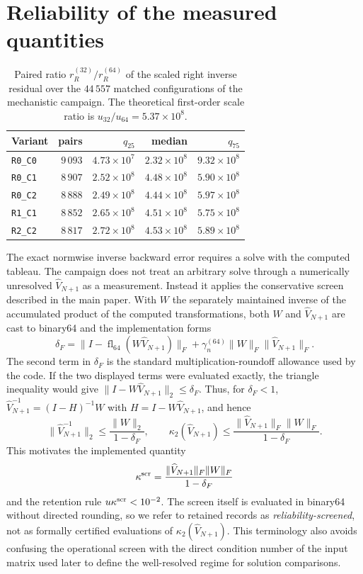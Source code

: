 \documentclass[supplement,review,onefignum,onetabnum]{siamart251216}
\newcommand{\fl}{\operatorname{fl}}
\begin{document}
\section{Reliability of the measured quantities}
\label{sm:reliability}

\begin{table}
\centering
\caption{Paired ratio $r_R^{(32)}/r_R^{(64)}$ of the scaled right inverse residual over the
$44\,557$ matched configurations of the mechanistic campaign. The theoretical first-order scale
ratio is $u_{32}/u_{64}=5.37\times10^8$.}
\label{tab:sm-uscaling}
\begin{tabular}{lrrrr}
\hline
Variant & pairs & $q_{25}$ & median & $q_{75}$ \\
\hline
\texttt{R0\_C0} & $9\,093$ & $4.73\times10^{7}$ & $2.32\times10^{8}$ & $9.32\times10^{8}$ \\
\texttt{R0\_C1} & $8\,907$ & $2.52\times10^{8}$ & $4.48\times10^{8}$ & $5.90\times10^{8}$ \\
\texttt{R0\_C2} & $8\,888$ & $2.49\times10^{8}$ & $4.44\times10^{8}$ & $5.97\times10^{8}$ \\
\texttt{R1\_C1} & $8\,852$ & $2.65\times10^{8}$ & $4.51\times10^{8}$ & $5.75\times10^{8}$ \\
\texttt{R2\_C2} & $8\,817$ & $2.72\times10^{8}$ & $4.53\times10^{8}$ & $5.89\times10^{8}$ \\
\hline
\end{tabular}
\end{table}

The exact normwise inverse backward error requires a solve with the computed tableau. The campaign
does not treat an arbitrary solve through a numerically unresolved $\widehat V_{N+1}$ as a
measurement. Instead it applies the conservative screen described in the main paper. With $W$ the
separately maintained inverse of the accumulated product of the computed transformations, both
$W$ and $\widehat V_{N+1}$ are cast to binary64 and the implementation forms
%
\[
\delta_F
=
\|I-\fl_{64}(W\widehat V_{N+1})\|_F
+
\gamma_n^{(64)}\|W\|_F\|\widehat V_{N+1}\|_F.
\]
%
The second term in $\delta_F$ is the standard multiplication-roundoff allowance used by the
code. If the two displayed terms were evaluated exactly, the triangle inequality would give
$\|I-W\widehat V_{N+1}\|_2\le\delta_F$. Thus, for $\delta_F<1$,
$\widehat V_{N+1}^{-1}=(I-H)^{-1}W$ with $H=I-W\widehat V_{N+1}$, and hence
%
\[
\|\widehat V_{N+1}^{-1}\|_2
\le\frac{\|W\|_2}{1-\delta_F},
\qquad
\kappa_2(\widehat V_{N+1})
\le
\frac{\|\widehat V_{N+1}\|_F\|W\|_F}{1-\delta_F}.
\]
%
This motivates the implemented quantity
%
\[
\kappa^{\rm scr}
=
\frac{\|\widehat V_{N+1}\|_F\|W\|_F}{1-\delta_F}
\]
%
and the retention rule $u\kappa^{\rm scr}<10^{-2}$. The screen itself is evaluated in binary64
without directed rounding, so we refer to retained records as \emph{reliability-screened}, not as
formally certified evaluations of $\kappa_2(\widehat V_{N+1})$. This terminology also avoids
confusing the operational screen with the direct condition number of the input matrix used later to
define the well-resolved regime for solution comparisons.
\end{document}
